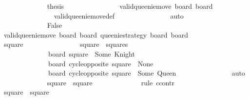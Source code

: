 \begin{isabellebody}
\ \ \ \ \ \ \ \ \ \ \ \ \isamarkupfalse%
\ {\isacharquery}thesis\isanewline
\ \ \ \ \ \ \ \ \ \ \ \ \ \ \isamarkupfalse%
\ {\isacharbackquoteopen}valid{\isacharunderscore}queenie{\isacharunderscore}move\ board{\isacharprime}\ board{\isacharprime}{\isacharprime}{\isacharbackquoteclose}\isanewline
\ \ \ \ \ \ \ \ \ \ \ \ \ \ \isamarkupfalse%
\ valid{\isacharunderscore}queenie{\isacharunderscore}move{\isacharunderscore}def\isanewline
\ \ \ \ \ \ \ \ \ \ \ \ \ \ \isamarkupfalse%
\ auto\isanewline
\ \ \ \ \ \ \ \ \ \ \isamarkupfalse%
\isanewline
\ \ \ \ \ \ \ \ \ \ \ \ \isamarkupfalse%
\ False\isanewline
\ \ \ \ \ \ \ \ \ \ \ \ \isamarkupfalse%
\ {\isacharbackquoteopen}valid{\isacharunderscore}queenie{\isacharunderscore}move\ board{\isacharprime}\ board{\isacharprime}{\isacharprime}{\isacharbackquoteclose}\ {\isacharbackquoteopen}{\isacharquery}queenie{\isacharunderscore}strategy\ board{\isacharprime}\ board{\isacharprime}{\isacharprime}{\isacharbackquoteclose}\isanewline
\ \ \ \ \ \ \ \ \ \ \ \ \isamarkupfalse%
\ square{\isacharprime}\ \ \isanewline
\ \ \ \ \ \ \ \ \ \ \ \ \ \ {\isachardoublequoteopen}square{\isacharprime}\ {\isasymin}\ squares{\isachardoublequoteclose}\isanewline
\ \ \ \ \ \ \ \ \ \ \ \ \ \ {\isachardoublequoteopen}board{\isacharprime}\ square{\isacharprime}\ {\isacharequal}\ Some\ Knight{\isachardoublequoteclose}\isanewline
\ \ \ \ \ \ \ \ \ \ \ \ \ \ {\isachardoublequoteopen}board{\isacharprime}\ {\isacharparenleft}cycle{\isacharunderscore}opposite\ square{\isacharprime}{\isacharparenright}\ {\isacharequal}\ None{\isachardoublequoteclose}\isanewline
\ \ \ \ \ \ \ \ \ \ \ \ \ \ {\isachardoublequoteopen}board{\isacharprime}{\isacharprime}\ {\isacharparenleft}cycle{\isacharunderscore}opposite\ square{\isacharprime}{\isacharparenright}\ {\isacharequal}\ Some\ Queen{\isachardoublequoteclose}\isanewline
\ \ \ \ \ \ \ \ \ \ \ \ \ \ \isamarkupfalse%
\ auto\isanewline
\isanewline
\ \ \ \ \ \ \ \ \ \ \ \ \isamarkupfalse%
\ {\isachardoublequoteopen}square\ {\isacharequal}\ square{\isacharprime}{\isachardoublequoteclose}\isanewline
\ \ \ \ \ \ \ \ \ \ \ \ \isamarkupfalse%
\ {\isacharparenleft}rule\ ccontr{\isacharparenright}\isanewline
\ \ \ \ \ \ \ \ \ \ \ \ \ \ \isamarkupfalse%
\ {\isachardoublequoteopen}square\ {\isasymnoteq}\ square{\isacharprime}{\isachardoublequoteclose}\isanewline
\ \ \ \ \ \ \ \ \ \ \ \ \ \ \isamarkupfalse%

\end{isabellebody}
